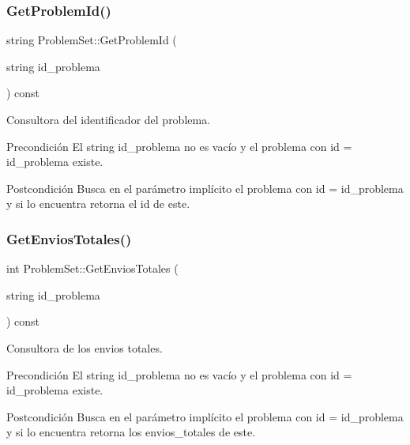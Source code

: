 \subsubsection{\texorpdfstring{Get\+Problem\+Id()}{GetProblemId()}}
{\footnotesize\ttfamily string Problem\+Set\+::\+Get\+Problem\+Id (\begin{DoxyParamCaption}\item[{string}]{id\+\_\+problema }\end{DoxyParamCaption}) const}



Consultora del identificador del problema. 

\begin{DoxyPrecond}{Precondición}
El string id\+\_\+problema no es vacío y el problema con id = id\+\_\+problema existe. 
\end{DoxyPrecond}
\begin{DoxyPostcond}{Postcondición}
Busca en el parámetro implícito el problema con id = id\+\_\+problema y si lo encuentra retorna el id de este. 
\end{DoxyPostcond}
\mbox{\label{class_problem_set_a33746a7a5aefdce5a4e8a5bf597c84f1}} 
\subsubsection{\texorpdfstring{Get\+Envios\+Totales()}{GetEnviosTotales()}}
{\footnotesize\ttfamily int Problem\+Set\+::\+Get\+Envios\+Totales (\begin{DoxyParamCaption}\item[{string}]{id\+\_\+problema }\end{DoxyParamCaption}) const}



Consultora de los envios totales. 

\begin{DoxyPrecond}{Precondición}
El string id\+\_\+problema no es vacío y el problema con id = id\+\_\+problema existe. 
\end{DoxyPrecond}
\begin{DoxyPostcond}{Postcondición}
Busca en el parámetro implícito el problema con id = id\+\_\+problema y si lo encuentra retorna los envios\+\_\+totales de este. 
\end{DoxyPostcond}
\mbox{\label{class_problem_set_aaf4917f4ebb7dc317ca91f1ecdbc2fe9}} 

